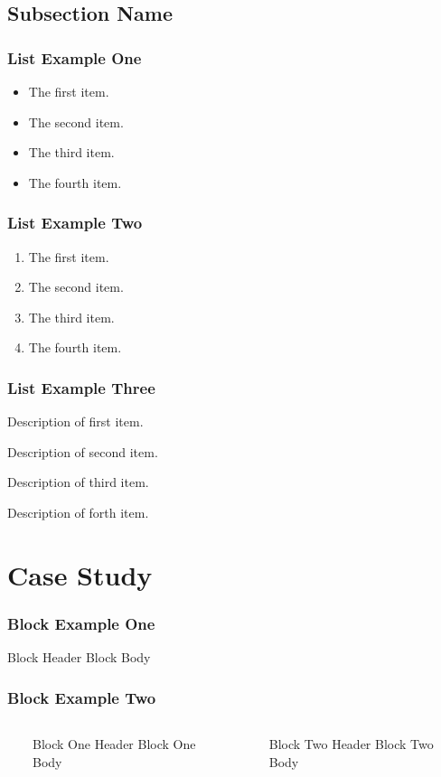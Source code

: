 \documentclass{beamer}
\begin{document}
\subsection{Subsection Name}

\begin{frame}
\frametitle{List Example One}
\begin{itemize} 
\item The first item.
\item The second item.
\item The third item.
\item The fourth item.
\end{itemize}
\end{frame}

\begin{frame}
\frametitle{List Example Two}
\begin{enumerate} 
\item The first item.
\item The second item.
\item The third item.
\item The fourth item.
\end{enumerate}
\end{frame}

\begin{frame}
\frametitle{List Example Three}
\begin{description} 
\item[First Item] Description of first item.
\item[Second Item] Description of second item.
\item[Third Item] Description of third item.
\item[Forth Item] Description of forth item.
\end{description}
\end{frame}

\section{Case Study}
\begin{frame}
\frametitle{Block Example One}
\begin{block}{Block Header}
	Block Body
\end{block}
\end{frame}

\begin{frame}
\frametitle{Block Example Two}
\begin{columns}
  \ 
	\begin{block}{Block One Header} 
		Block One Body 
	\end{block} 
 \ 
	\begin{block}{Block Two Header} 
		Block Two Body
	\end{block} 
\end{columns}
\end{frame}
\end{document}
